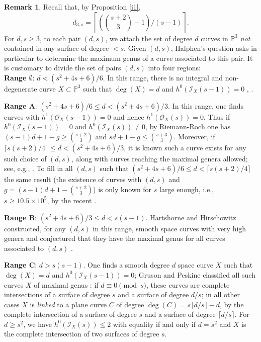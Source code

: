 \documentclass[a4, 11pt]{amsart}
\theoremstyle{plain}
\theoremstyle{definition}
\newtheorem{remark}[theorem]{Remark}
\newcommand{\enm}[1]{\ensuremath{#1}}          %
\newcommand{\cal}[1]{\mathcal{#1}}
\newcommand{\PP}{\enm{\mathbb{P}}}
\newcommand{\Ii}{\enm{\cal{I}}}
\newcommand{\Oo}{\enm{\cal{O}}}
\begin{document}
\begin{remark}\label{x2}
Recall that, by Proposition \ref{i1}, 
\[
d_{3,s} = \left\lceil \left(\binom{s+2}{3}-1\right)/(s-1)\right\rceil.
\]  
For $d, s\ge 3$, to  each pair $(d,s)$, we attach the set of degree $d$ curves in $\PP^3$ 
{\it not} contained in any surface of degree $<s$. Given $(d,s)$, Halphen's question asks in particular to determine the maximum genus of a curve associated to this pair. It is customary to divide the set of pairs $(d,s)$ into four regions: \\

{\bf Range $\emptyset$}: $d < (s^2+4s+6)/6 $. In this range, there is no integral and non-degenerate curve $X\subset \PP^3$ such that
$\deg (X)=d$ and $h^0(\Ii _X(s-1))=0$ \cite[Theorem 3.3]{h0}, \cite{hh}. 

\vspace{5mm}
{\bf Range A}: $(s^2+4s+6)/6 \le d < (s^2+4s+6)/3$. In this range, one finds curves with  
$h^1(\Oo _X(s-1)) =0$ and hence $h^1(\Oo _X(s))=0$. Thus if $h^0(\Ii _X(s-1))=0$ and $h^0(\Ii _X(s)) \ne 0$, by Riemann-Roch one has $(s-1)d+1-g
\ge \binom{s+2}{3}$ and $sd+1-g\le \binom{s+3}{3}$. Moreover, if $\lceil s(s+2)/4\rceil \le d <(s^2+4s+6)/3$, it is known such a curve exists for any such choice of $(d,s)$, along with curves reaching the maximal genera allowed; see, e.g., \cite{bbem, fl1,fl2}.  To fill in all 
$(d,s)$ such that $(s^2+4s+6)/6\le d < \lceil s(s+2)/4\rceil$ the same result (the existence of curves with $(d,s)$ and $g= (s-1)d+1- \binom{s+2}{3}$) is only known for $s$ large enough, i.e., $s \geq 10.5\times 10^5$, by the recent \cite[Theorem 1]{be6}. 

\vspace{5mm}
{\bf Range B}: $(s^2+4s+6)/3\le d < s(s-1)$. Hartshorne and Hirschowitz constructed, for any $(d, s)$ in this range, smooth space curves with very high genera and conjectured that they have the maximal genus for all curves associated to $(d,s)$ \cite{hh, ms}. 

\vspace{5mm}
{\bf Range C}: $d>s(s-1)$. One finds a smooth degree $d$ space curve $X$ such that
$\deg (X)=d$ and $h^0(\Ii _X(s-1))=0$; Gruson and Peskine classified all such curves $X$ of maximal genus \cite{gp1}: 
if $d\equiv 0\pmod{s}$, these curves are complete intersections of a surface of degree $s$ and a surface of degree $d/s$; in all other
cases $X$ is {\it linked} to a plane curve $C$ of degree $\deg(C) = s\lceil d/s\rceil -d$, by the complete intersection of a surface of degree $s$
and a surface of degree $\lceil d/s\rceil$. For $d\geq s^2$, we have $h^0(\Ii _X(s)) \le 2$ with equality if and only if $d=s^2$
and $X$ is the complete intersection of two surfaces of degree $s$.
\end{remark}
\end{document}
